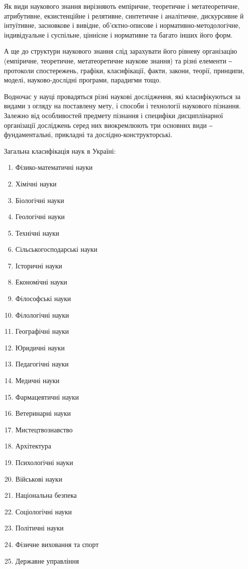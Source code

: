 Як види наукового знання вирізняють емпіричне, теоретичне і
метатеоретичне, атрибутивне, екзистенційне і релятивне, синтетичне і
аналітичне, дискурсивне й інтуїтивне, засновкове і вивідне, об’єктно-описове і
нормативно-методологічне, індивідуальне і суспільне, ціннісне і нормативне та
багато інших його форм.

А ще до структури наукового знання слід зарахувати його рівневу
організацію (емпіричне, теоретичне, метатеоретичне наукове знання) та різні
елементи ‒ протоколи спостережень, графіки, класифікації, факти, закони,
теорії, принципи, моделі, науково-дослідні програми, парадигми тощо.

Водночас у науці провадяться різні наукові дослідження, які
класифікуються за видами з огляду на поставлену мету, і способи і технології
наукового пізнання. Залежно від особливостей предмету пізнання і специфіки
дисциплінарної організації досліджень серед них виокремлюють три основних
види ‒ фундаментальні, прикладні та дослідно-конструкторські.

Загальна класифікація наук в Україні:
\begin{enumerate}
	\item Фізико-математичні науки
	\item Хімічні науки
	\item Біологічні науки
	\item Геологічні науки
	\item Технічні науки
	\item Сільськогосподарські науки
	\item Історичні науки
	\item Економічні науки
	\item Філософські науки
	\item Філологічні науки
	\item Географічні науки
	\item Юридичні науки
	\item Педагогічні науки
	\item Медичні науки
	\item Фармацевтичні науки
	\item Ветеринарні науки
	\item Мистецтвознавство
	\item Архітектура
	\item Психологічні науки
	\item Військові науки
	\item Національна безпека
	\item Соціологічні науки
	\item Політичні науки
	\item Фізичне виховання та спорт
	\item Державне управління
\end{enumerate}

